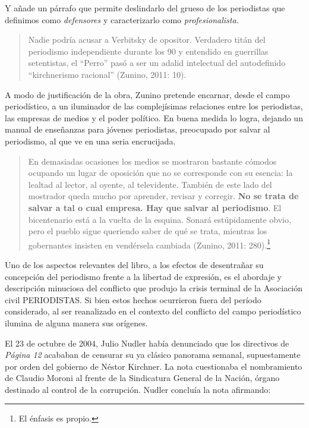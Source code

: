Y añade un párrafo que permite deslindarlo del grueso de los periodistas que definimos como \emph{defensores} y caracterizarlo como \emph{profesionalista.}

\begin{quote}
Nadie podría acusar a Verbitsky de opositor. Verdadero titán del periodismo independiente durante los 90 y entendido en guerrillas setentistas, el ``Perro'' pasó a ser un adalid intelectual del autodefinido ``kirchnerismo racional'' (Zunino, 2011: 10).
\end{quote}

A modo de justificación de la obra, Zunino pretende encarnar, desde el campo periodístico, a un iluminador de las complejísimas relaciones entre los periodistas, las empresas de medios y el poder político. En buena medida lo logra, dejando un manual de enseñanzas para jóvenes periodistas, preocupado por salvar al periodismo, al que ve en una seria encrucijada.

\begin{quote}
En demasiadas ocasiones los medios se mostraron bastante cómodos ocupando un lugar de oposición que no se corresponde con su esencia: la lealtad al lector, al oyente, al televidente. También de este lado del mostrador queda mucho por aprender, revisar y corregir. \textbf{No se trata de salvar a tal o cual empresa. Hay que salvar al periodismo}. El bicentenario está a la vuelta de la esquina. Sonará estúpidamente obvio, pero el pueblo sigue queriendo saber de qué se trata, mientras los gobernantes insisten en vendérsela cambiada (Zunino, 2011: 280).\footnote{El énfasis es propio.}
\end{quote}

Uno de los aspectos relevantes del libro, a los efectos de desentrañar su concepción del periodismo frente a la libertad de expresión, es el abordaje y descripción minuciosa del conflicto que produjo la crisis terminal de la Asociación civil PERIODISTAS. Si bien estos hechos ocurrieron fuera del período considerado, al ser reanalizado en el contexto del conflicto del campo periodístico ilumina de alguna manera sus orígenes.

El 23 de octubre de 2004, Julio Nudler había denunciado que los directivos de \emph{Página 12} acababan de censurar su ya clásico panorama semanal, supuestamente por orden del gobierno de Néstor Kirchner. La nota cuestionaba el nombramiento de Claudio Moroni al frente de la Sindicatura General de la Nación, órgano destinado  al control de la corrupción. Nudler concluía la nota afirmando:

